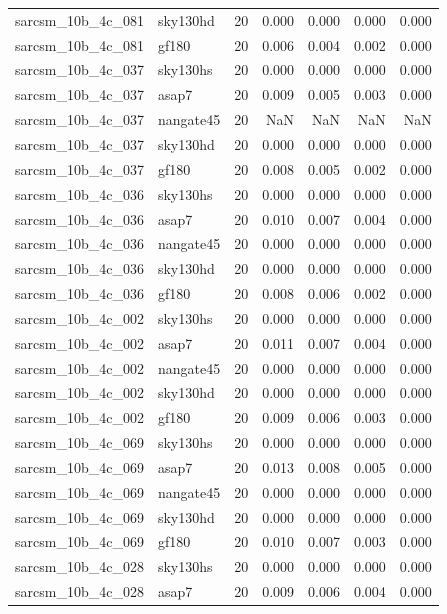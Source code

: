 \begin{tabular}{llrrrrr}
sarcsm\_10b\_4c\_081 & sky130hd & 20 & 0.000 & 0.000 & 0.000 & 0.000 \\
sarcsm\_10b\_4c\_081 & gf180 & 20 & 0.006 & 0.004 & 0.002 & 0.000 \\
sarcsm\_10b\_4c\_037 & sky130hs & 20 & 0.000 & 0.000 & 0.000 & 0.000 \\
sarcsm\_10b\_4c\_037 & asap7 & 20 & 0.009 & 0.005 & 0.003 & 0.000 \\
sarcsm\_10b\_4c\_037 & nangate45 & 20 & NaN & NaN & NaN & NaN \\
sarcsm\_10b\_4c\_037 & sky130hd & 20 & 0.000 & 0.000 & 0.000 & 0.000 \\
sarcsm\_10b\_4c\_037 & gf180 & 20 & 0.008 & 0.005 & 0.002 & 0.000 \\
sarcsm\_10b\_4c\_036 & sky130hs & 20 & 0.000 & 0.000 & 0.000 & 0.000 \\
sarcsm\_10b\_4c\_036 & asap7 & 20 & 0.010 & 0.007 & 0.004 & 0.000 \\
sarcsm\_10b\_4c\_036 & nangate45 & 20 & 0.000 & 0.000 & 0.000 & 0.000 \\
sarcsm\_10b\_4c\_036 & sky130hd & 20 & 0.000 & 0.000 & 0.000 & 0.000 \\
sarcsm\_10b\_4c\_036 & gf180 & 20 & 0.008 & 0.006 & 0.002 & 0.000 \\
sarcsm\_10b\_4c\_002 & sky130hs & 20 & 0.000 & 0.000 & 0.000 & 0.000 \\
sarcsm\_10b\_4c\_002 & asap7 & 20 & 0.011 & 0.007 & 0.004 & 0.000 \\
sarcsm\_10b\_4c\_002 & nangate45 & 20 & 0.000 & 0.000 & 0.000 & 0.000 \\
sarcsm\_10b\_4c\_002 & sky130hd & 20 & 0.000 & 0.000 & 0.000 & 0.000 \\
sarcsm\_10b\_4c\_002 & gf180 & 20 & 0.009 & 0.006 & 0.003 & 0.000 \\
sarcsm\_10b\_4c\_069 & sky130hs & 20 & 0.000 & 0.000 & 0.000 & 0.000 \\
sarcsm\_10b\_4c\_069 & asap7 & 20 & 0.013 & 0.008 & 0.005 & 0.000 \\
sarcsm\_10b\_4c\_069 & nangate45 & 20 & 0.000 & 0.000 & 0.000 & 0.000 \\
sarcsm\_10b\_4c\_069 & sky130hd & 20 & 0.000 & 0.000 & 0.000 & 0.000 \\
sarcsm\_10b\_4c\_069 & gf180 & 20 & 0.010 & 0.007 & 0.003 & 0.000 \\
sarcsm\_10b\_4c\_028 & sky130hs & 20 & 0.000 & 0.000 & 0.000 & 0.000 \\
sarcsm\_10b\_4c\_028 & asap7 & 20 & 0.009 & 0.006 & 0.004 & 0.000 \\

\end{tabular}
